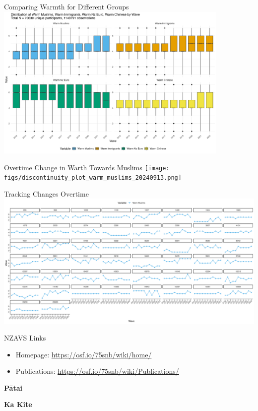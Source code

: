\documentclass[
  ignorenonframetext,
  aspectratio=169,
]{beamer}
\providecommand{\tightlist}{%
  \setlength{\itemsep}{0pt}\setlength{\parskip}{0pt}}\usepackage{longtable,booktabs,array}
\begin{document}
\begin{frame}{Comparing Warmth for Different Groups}
\label{comparing-warmth-for-different-groups}
\includegraphics[width=0.85\textwidth,height=\textheight]{figs/image002.png}
\end{frame}

\begin{frame}{Overtime Change in Warth Towards Muslims}
\label{overtime-change-in-warth-towards-muslims}
\texttt{[image: figs/discontinuity\_plot\_warm\_muslims\_20240913.png]}
\end{frame}

\begin{frame}{Tracking Changes Overtime}
\label{tracking-changes-overtime}
\includegraphics{figs/seed.png}
\end{frame}

\begin{frame}{NZAVS Links}
\label{nzavs-links}
\begin{itemize}
\tightlist
\item
  Homepage: \url{https://osf.io/75snb/wiki/home/}
\item
  Publications: \url{https://osf.io/75snb/wiki/Publications/}
\end{itemize}
\end{frame}

\begin{frame}
\textbf{Pātai}
\end{frame}

\begin{frame}
\textbf{Ka Kite}
\end{frame}
\end{document}
